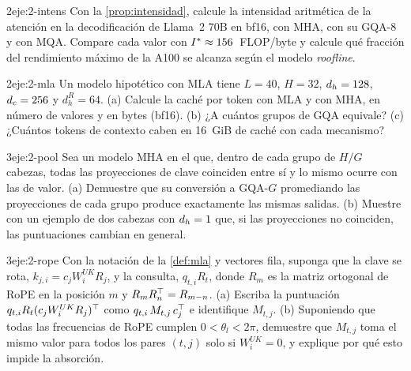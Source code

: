 \begin{ejercicio}{2}{eje:2-intens}
Con la \cref{prop:intensidad}, calcule la intensidad aritmética de la atención en la decodificación de Llama~2 70B en bf16, con MHA, con su GQA-8 y con MQA. Compare cada valor con $I^{\ast}\approx 156$~FLOP/byte y calcule qué fracción del rendimiento máximo de la A100 se alcanza según el modelo \emph{roofline}.
\end{ejercicio}

\begin{ejercicio}{2}{eje:2-mla}
Un modelo hipotético con MLA tiene $L=40$, $H=32$, $d_{h}=128$, $d_{c}=256$ y $d_h^{R}=64$. (a) Calcule la caché por token con MLA y con MHA, en número de valores y en bytes (bf16). (b) ¿A cuántos grupos de GQA equivale? (c) ¿Cuántos tokens de contexto caben en 16~GiB de caché con cada mecanismo?
\end{ejercicio}

\begin{ejercicio}{3}{eje:2-pool}
Sea un modelo MHA en el que, dentro de cada grupo de $H/G$ cabezas, todas las proyecciones de clave coinciden entre sí y lo mismo ocurre con las de valor. (a) Demuestre que su conversión a GQA-$G$ promediando las proyecciones de cada grupo produce exactamente las mismas salidas. (b) Muestre con un ejemplo de dos cabezas con $d_{h}=1$ que, si las proyecciones no coinciden, las puntuaciones cambian en general.
\end{ejercicio}

\begin{ejercicio}{3}{eje:2-rope}
Con la notación de la \cref{def:mla} y vectores fila, suponga que la clave se rota, $k_{j,i}=c_jW^{UK}_iR_j$, y la consulta, $q_{t,i}R_t$, donde $R_m$ es la matriz ortogonal de RoPE en la posición $m$ y $R_m R_n^{\top}=R_{m-n}$. (a) Escriba la puntuación $q_{t,i}R_t(c_jW^{UK}_iR_j)^{\top}$ como $q_{t,i}\,M_{t,j}\,c_j^{\top}$ e identifique $M_{t,j}$. (b) Suponiendo que todas las frecuencias de RoPE cumplen $0<\theta_l<2\pi$, demuestre que $M_{t,j}$ toma el mismo valor para todos los pares $(t,j)$ solo si $W^{UK}_i=0$, y explique por qué esto impide la absorción.
\end{ejercicio}
